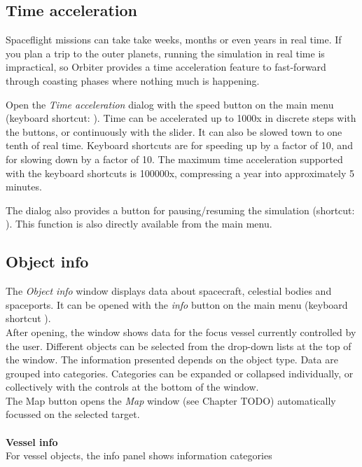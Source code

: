 \documentclass[Orbiter User Manual.tex]{subfiles}
\begin{document}
\subsection{Time acceleration}
Spaceflight missions can take take weeks, months or even years in real time. If you plan a trip to the outer planets, running the simulation in real time is impractical, so Orbiter provides a time acceleration feature to fast-forward through coasting phases where nothing much is happening.

\begin{figure}[H]
	\centering
\end{figure}

\noindent
Open the \textit{Time acceleration} dialog with the speed button on the main menu (keyboard shortcut: \Ctrl{}). Time can be accelerated up to 1000x in discrete steps with the buttons, or continuously with the slider. It can also be slowed town to one tenth of real time. Keyboard shortcuts are  for speeding up by a factor of 10, and  for slowing down by a factor of 10. The maximum time acceleration supported with the keyboard shortcuts is 100000x, compressing a year into approximately 5 minutes.


The dialog also provides a button for pausing/resuming the simulation (shortcut: \Ctrl{}). This function is also directly available from the main menu.


\subsection{Object info}
The \textit{Object info} window displays data about spacecraft, celestial bodies and spaceports. It can be opened with the \textit{info} button on the main menu (keyboard shortcut \Ctrl{}).\\
After opening, the window shows data for the focus vessel currently controlled by the user. Different objects can be selected from the drop-down lists at the top of the window. The information presented depends on the object type. Data are grouped into categories. Categories can be expanded or collapsed individually, or collectively with the controls at the bottom of the window.\\
The Map button opens the \textit{Map} window (see Chapter TODO) automatically focussed on the selected target.\\
\\
\textbf{Vessel info}\\
For vessel objects, the info panel shows information categories
\end{document}
